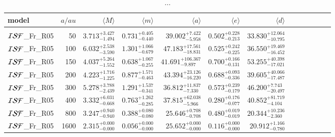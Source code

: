 \documentclass[aa]{lib/aa}
\begin{document}
\begin{table}
 \caption{...}
 \label{Tab:model_ISF_vs_sma_parameters}
 \centering 
 \begin{tabular}{lrrrrrrrrrrrr}
   \hline\hline
model &$a/au$ & $\langle M \rangle$ & $\langle m \rangle$ & $\langle a \rangle$ & $\langle e \rangle$ & $\langle d \rangle$ \\
        \hline \vspace{-0.75em}\\
${\cal ISF}$\_Fr\_R05 & 50 &$3.713^{+3.427}_{-1.494}$ & $0.731^{+0.405}_{-0.440}$ & $39.002^{+7.422}_{-5.958}$ & $0.502^{+0.228}_{-0.213}$& $33.830^{+12.064}_{-10.795}$  \\
${\cal ISF}$\_Fr\_R05 &100 &$6.032^{+2.538}_{-3.590}$ & $1.301^{+1.066}_{-0.679}$ & $47.183^{+17.561}_{-18.831}$ & $0.525^{+0.242}_{-0.225}$& $36.550^{+19.469}_{-16.452}$  \\
${\cal ISF}$\_Fr\_R05 &150 & $4.037^{+5.264}_{-1.552}$ & $0.638^{+1.067}_{-0.255}$ & $41.691^{+106.367}_{-9.897}$ & $0.700^{+0.166}_{-0.131}$& $53.255^{+40.398}_{-17.021}$  \\
${\cal ISF}$\_Fr\_R05 &200 &$4.223^{+1.716}_{-1.225}$ & $0.877^{+1.571}_{-0.463}$ & $43.394^{+23.126}_{-16.220}$ & $0.688^{+0.093}_{-0.336}$& $39.605^{+40.066}_{-17.487}$  \\
${\cal ISF}$\_Fr\_R05 &300 &$5.278^{+3.788}_{-2.439}$ & $1.291^{+1.537}_{-0.341}$ & $36.812^{+11.837}_{-7.330}$ & $0.573^{+0.239}_{-0.179}$& $46.200^{+7.743}_{-20.497}$  \\
${\cal ISF}$\_Fr\_R05 &400 &$3.332^{+6.031}_{-0.668}$ & $0.763^{+1.262}_{-0.285}$ & $37.815^{+62.038}_{-5.966}$ & $0.280^{+0.176}_{-0.077}$& $40.852^{+81.719}_{-4.104}$  \\
${\cal ISF}$\_Fr\_R05 &800 &$3.247^{+0.940}_{-0.940}$ & $0.388^{+0.080}_{-0.080}$ & $25.646^{+0.708}_{-0.708}$ & $0.480^{+0.019}_{-0.019}$& $20.344^{+10.236}_{-2.360}$  \\
${\cal ISF}$\_Fr\_R05 &1600 &$2.315^{+0.000}_{-0.000}$ & $0.056^{+0.000}_{-0.000}$ & $25.652^{+0.000}_{-0.000}$ & $0.116^{+0.000}_{-0.000}$& $20.912^{+1.166}_{-0.780}$  \\
\end{tabular}
\end{table}
\end{document}
